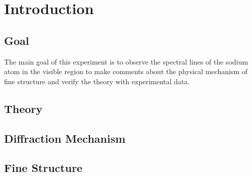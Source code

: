 \section{Introduction}

	\subsection{Goal}
	The main goal of this experiment is to observe the spectral lines of the sodium atom in the visible region to make comments about the physical mechanism of fine structure and verify the theory with experimental data.
	
	\subsection{Theory}
		\subsection{Diffraction Mechanism}
		
		\subsection{Fine Structure}